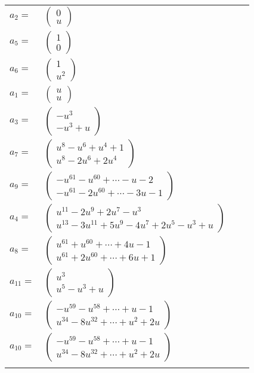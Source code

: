 \documentclass[1p]{elsarticle_modified}
\theoremstyle{definition}
\begin{document}
\begin{tabular}{m{7pt} m{180pt} m{7pt} m{180pt} }
\flushright $a_{2}=$&$\begin{pmatrix}0\\u\end{pmatrix}$ \\
\flushright $a_{5}=$&$\begin{pmatrix}1\\0\end{pmatrix}$ \\
\flushright $a_{6}=$&$\begin{pmatrix}1\\u^2\end{pmatrix}$ \\
\flushright $a_{1}=$&$\begin{pmatrix}u\\u\end{pmatrix}$ \\
\flushright $a_{3}=$&$\begin{pmatrix}- u^3\\- u^3+u\end{pmatrix}$ \\
\flushright $a_{7}=$&$\begin{pmatrix}u^8- u^6+u^4+1\\u^8-2 u^6+2 u^4\end{pmatrix}$ \\
\flushright $a_{9}=$&$\begin{pmatrix}- u^{61}- u^{60}+\cdots- u-2\\- u^{61}-2 u^{60}+\cdots-3 u-1\end{pmatrix}$ \\
\flushright $a_{4}=$&$\begin{pmatrix}u^{11}-2 u^9+2 u^7- u^3\\u^{13}-3 u^{11}+5 u^9-4 u^7+2 u^5- u^3+u\end{pmatrix}$ \\
\flushright $a_{8}=$&$\begin{pmatrix}u^{61}+u^{60}+\cdots+4 u-1\\u^{61}+2 u^{60}+\cdots+6 u+1\end{pmatrix}$ \\
\flushright $a_{11}=$&$\begin{pmatrix}u^3\\u^5- u^3+u\end{pmatrix}$ \\
\flushright $a_{10}=$&$\begin{pmatrix}- u^{59}- u^{58}+\cdots+u-1\\u^{34}-8 u^{32}+\cdots+u^2+2 u\end{pmatrix}$\\ \flushright $a_{10}=$&$\begin{pmatrix}- u^{59}- u^{58}+\cdots+u-1\\u^{34}-8 u^{32}+\cdots+u^2+2 u\end{pmatrix}$\\&\end{tabular}
\end{document}
